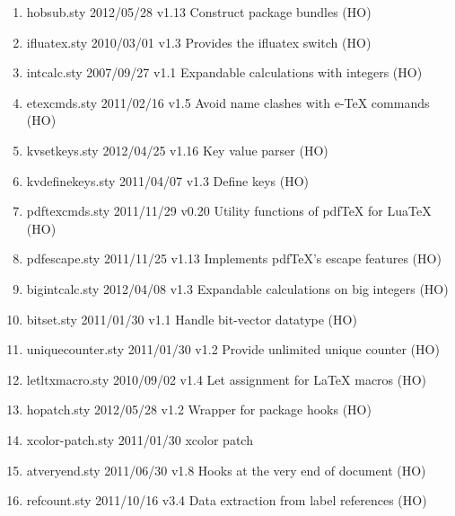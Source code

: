 \begin{enumerate}
\item 		 hobsub.sty 2012/05/28 v1.13 Construct package bundles (HO)
\item 		 ifluatex.sty 2010/03/01 v1.3 Provides the ifluatex switch (HO)
\item 		 intcalc.sty 2007/09/27 v1.1 Expandable calculations with integers (HO)
\item 		 etexcmds.sty 2011/02/16 v1.5 Avoid name clashes with e-TeX commands (HO)
\item 		 kvsetkeys.sty 2012/04/25 v1.16 Key value parser (HO)
\item 		 kvdefinekeys.sty 2011/04/07 v1.3 Define keys (HO)
\item pdftexcmds.sty 2011/11/29 v0.20 Utility functions of pdfTeX for LuaTeX (HO)
\item pdfescape.sty 2011/11/25 v1.13 Implements pdfTeX's escape features (HO)
\item bigintcalc.sty 2012/04/08 v1.3 Expandable calculations on big integers (HO)
\item bitset.sty 2011/01/30 v1.1 Handle bit-vector datatype (HO)
\item 		 uniquecounter.sty 2011/01/30 v1.2 Provide unlimited unique counter (HO)
\item 		 letltxmacro.sty 2010/09/02 v1.4 Let assignment for LaTeX macros (HO)
\item 		 hopatch.sty 2012/05/28 v1.2 Wrapper for package hooks (HO)
\item 		 xcolor-patch.sty 2011/01/30 xcolor patch
\item atveryend.sty 2011/06/30 v1.8 Hooks at the very end of document (HO)
\item refcount.sty 2011/10/16 v3.4 Data extraction from label references (HO)

\end{enumerate}
